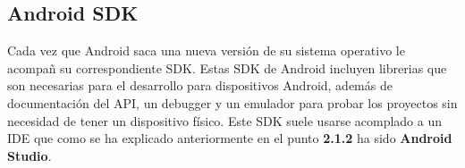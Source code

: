 \subsection{Android SDK}
\label{cap2:subsec:android}

Cada vez que Android saca una nueva versi\'on de su sistema operativo le acompa\~n su correspondiente SDK. Estas SDK de Android incluyen librerias que son necesarias para el desarrollo para dispositivos Android, adem\'as de documentaci\'on del API, un debugger y un emulador para probar los proyectos sin necesidad de tener un dispositivo f\'isico. Este SDK suele usarse acomplado a un IDE que como se ha explicado anteriormente en el punto \textbf{2.1.2} ha sido \textbf{Android Studio}.




